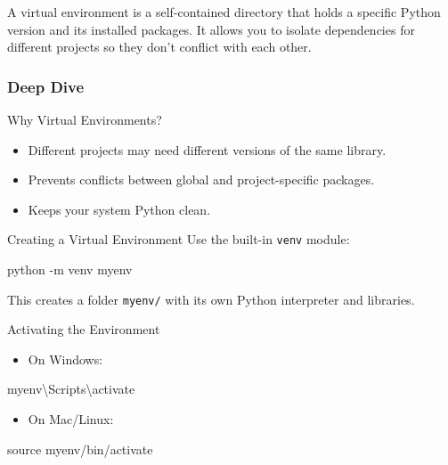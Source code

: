 \documentclass[
  letterpaper,
  DIV=11,
  numbers=noendperiod]{scrreprt}
\newenvironment{Shaded}{\begin{snugshade}}{\end{snugshade}}
\newcommand{\AttributeTok}[1]{\textcolor[rgb]{0.40,0.45,0.13}{#1}}
\newcommand{\BuiltInTok}[1]{\textcolor[rgb]{0.00,0.23,0.31}{#1}}
\newcommand{\ExtensionTok}[1]{\textcolor[rgb]{0.00,0.23,0.31}{#1}}
\newcommand{\NormalTok}[1]{\textcolor[rgb]{0.00,0.23,0.31}{#1}}
\providecommand{\tightlist}{%
  \setlength{\itemsep}{0pt}\setlength{\parskip}{0pt}}
\begin{document}
A virtual environment is a self-contained directory that holds a
specific Python version and its installed packages. It allows you to
isolate dependencies for different projects so they don't conflict with
each other.

\subsubsection{Deep Dive}\label{deep-dive-48}

Why Virtual Environments?

\begin{itemize}
\tightlist
\item
  Different projects may need different versions of the same library.
\item
  Prevents conflicts between global and project-specific packages.
\item
  Keeps your system Python clean.
\end{itemize}

Creating a Virtual Environment Use the built-in \texttt{venv} module:

\begin{Shaded}
\begin{Highlighting}[]
\ExtensionTok{python} \AttributeTok{{-}m}\NormalTok{ venv myenv}
\end{Highlighting}
\end{Shaded}

This creates a folder \texttt{myenv/} with its own Python interpreter
and libraries.

Activating the Environment

\begin{itemize}
\tightlist
\item
  On Windows:
\end{itemize}

\begin{Shaded}
\begin{Highlighting}[]
\ExtensionTok{myenv\textbackslash{}Scripts\textbackslash{}activate}
\end{Highlighting}
\end{Shaded}

\begin{itemize}
\tightlist
\item
  On Mac/Linux:
\end{itemize}

\begin{Shaded}
\begin{Highlighting}[]
\BuiltInTok{source}\NormalTok{ myenv/bin/activate}
\end{Highlighting}
\end{Shaded}
\end{document}
